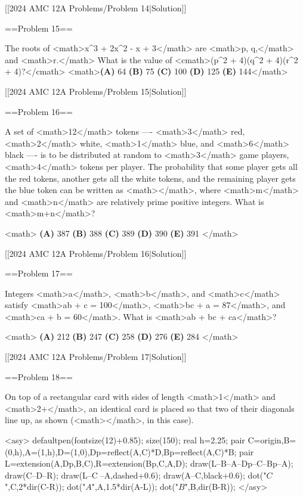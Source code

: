 [[2024 AMC 12A Problems/Problem 14|Solution]]

==Problem 15==

The roots of <math>x^3 + 2x^2 - x + 3</math> are <math>p, q,</math> and <math>r.</math> What is the value of <cmath>(p^2 + 4)(q^2 + 4)(r^2 + 4)?</cmath>
<math>\textbf{(A) } 64 \qquad \textbf{(B) } 75 \qquad \textbf{(C) } 100 \qquad \textbf{(D) } 125 \qquad \textbf{(E) } 144</math>

[[2024 AMC 12A Problems/Problem 15|Solution]]

==Problem 16==

A set of <math>12</math> tokens ---- <math>3</math> red, <math>2</math> white, <math>1</math> blue, and <math>6</math> black ---- is to be distributed at random to <math>3</math> game players, <math>4</math> tokens per player. The probability that some player gets all the red tokens, another gets all the white tokens, and the remaining player gets the blue token can be written as <math></math>, where <math>m</math> and <math>n</math> are relatively prime positive integers. What is <math>m+n</math>?

<math>
\textbf{(A) }387 \qquad
\textbf{(B) }388 \qquad
\textbf{(C) }389 \qquad
\textbf{(D) }390 \qquad
\textbf{(E) }391 \qquad
</math>

[[2024 AMC 12A Problems/Problem 16|Solution]]

==Problem 17==

Integers <math>a</math>, <math>b</math>, and <math>c</math> satisfy <math>ab + c = 100</math>, <math>bc + a = 87</math>, and <math>ca + b = 60</math>. What is <math>ab + bc + ca</math>?

<math>
\textbf{(A) }212 \qquad
\textbf{(B) }247 \qquad
\textbf{(C) }258 \qquad
\textbf{(D) }276 \qquad
\textbf{(E) }284 \qquad
</math>

[[2024 AMC 12A Problems/Problem 17|Solution]]

==Problem 18==

On top of a rectangular card with sides of length <math>1</math> and <math>2+</math>, an identical card is placed so that two of their diagonals line up, as shown (<math></math>, in this case).

<asy>
defaultpen(fontsize(12)+0.85); size(150);
real h=2.25;
pair C=origin,B=(0,h),A=(1,h),D=(1,0),Dp=reflect(A,C)*D,Bp=reflect(A,C)*B;
pair L=extension(A,Dp,B,C),R=extension(Bp,C,A,D);
draw(L--B--A--Dp--C--Bp--A);
draw(C--D--R);
draw(L--C^^R--A,dashed+0.6);
draw(A--C,black+0.6);
dot("$C$",C,2*dir(C-R)); dot("$A$",A,1.5*dir(A-L)); dot("$B$",B,dir(B-R));
</asy>

